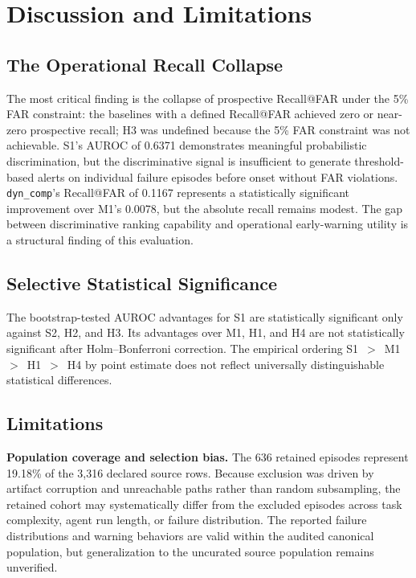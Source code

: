 \documentclass[conference]{IEEEtran}
\begin{document}
\section{Discussion and Limitations}

\subsection{The Operational Recall Collapse}

The most critical finding is the collapse of prospective Recall@FAR
under the 5\% FAR constraint: the baselines with a defined Recall@FAR
achieved zero or near-zero prospective recall; H3 was undefined because
the 5\% FAR constraint was not achievable. S1's AUROC of 0.6371
demonstrates meaningful probabilistic discrimination, but the
discriminative signal is insufficient to generate threshold-based
alerts on individual failure episodes before onset without FAR
violations. \texttt{dyn\_comp}'s Recall@FAR of 0.1167
represents a statistically significant improvement over M1's 0.0078, but
the absolute recall remains modest. The gap between discriminative
ranking capability and operational early-warning utility is a structural
finding of this evaluation.

\subsection{Selective Statistical Significance}

The bootstrap-tested AUROC advantages for S1 are statistically
significant only against S2, H2, and H3.
Its advantages over M1, H1, and H4 are not statistically significant
after Holm--Bonferroni correction. The empirical ordering
S1~$>$~M1~$>$~H1~$>$~H4 by point estimate does not reflect universally
distinguishable statistical differences.

\subsection{Limitations}

\textbf{Population coverage and selection bias.} The 636 retained
episodes represent 19.18\% of the 3{,}316 declared source rows. Because
exclusion was driven by artifact corruption and unreachable paths
rather than random subsampling, the retained cohort may systematically
differ from the excluded episodes across task complexity, agent run
length, or failure distribution. The reported failure distributions and
warning behaviors are valid within the audited canonical population,
but generalization to the uncurated source population remains
unverified.
\end{document}
